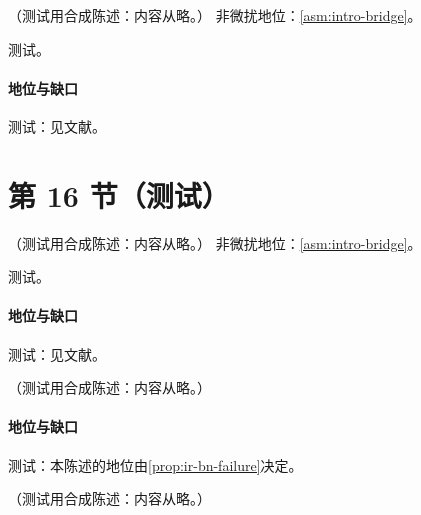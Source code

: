\begin{proposition}\label{prop:front-lepton-pdf}
（测试用合成陈述：内容从略。）
非微扰地位：\cref{asm:intro-bridge}。
\end{proposition}
\begin{proofsketch}测试。\end{proofsketch}
\paragraph{地位与缺口}测试：见文献。

\section{第 16 节（测试）}\label{sec:front-status}

\begin{proposition}\label{prop:front-ew-pdf}
（测试用合成陈述：内容从略。）
非微扰地位：\cref{asm:intro-bridge}。
\end{proposition}
\begin{proofsketch}测试。\end{proofsketch}
\paragraph{地位与缺口}测试：见文献。

\begin{proposition}\label{prop:front-ew-violation}
（测试用合成陈述：内容从略。）
\end{proposition}
\paragraph{地位与缺口}测试：本陈述的地位由\cref{prop:ir-bn-failure}决定。

\begin{remark}[开放问题]\label{rem:front-open}
（测试用合成陈述：内容从略。）
\end{remark}
